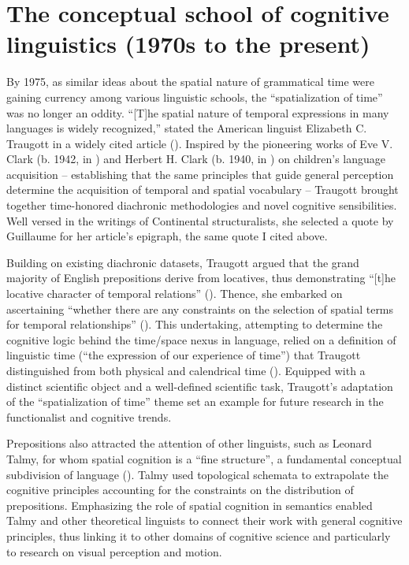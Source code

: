\documentclass[english,output=paper,colorlinks,citecolor=brown]{../langscibook}
\begin{document}
\section{The conceptual school of cognitive linguistics (1970s to the present)}

By 1975, as similar ideas about the spatial nature of grammatical time were gaining currency among various linguistic schools, the “spatialization of time” was no longer an oddity. “[T]he spatial nature of temporal expressions in many languages is widely recognized,” stated the American linguist Elizabeth C. Traugott in a widely cited article (\citeyear[207]{Traugott1975}). Inspired by the pioneering works of Eve V. Clark (b. 1942, in \citeyear{Clark1971}) and Herbert H. Clark (b. 1940, in \citeyear{Clark1973}) on children’s language acquisition -- establishing that the same principles that guide general perception determine the acquisition of temporal and spatial vocabulary -- Traugott brought together time-honored diachronic methodologies and novel cognitive sensibilities. Well versed in the writings of Continental structuralists, she selected a quote by Guillaume for her article’s epigraph, the same quote I cited above.

Building on existing diachronic datasets, Traugott argued that the grand majority of English prepositions derive from locatives, thus demonstrating “[t]he locative character of temporal relations” (\citeyear[209]{Traugott1975}). Thence, she embarked on ascertaining “whether there are any constraints on the selection of spatial terms for temporal relationships” (\citeyear[207]{Traugott1975}). This undertaking, attempting to determine the cognitive logic behind the time/space nexus in language, relied on a definition of linguistic time (“the expression of our experience of time”) that Traugott distinguished from both physical and calendrical time (\citeyear{Traugott1975}). Equipped with a distinct scientific object and a well-defined scientific task, Traugott’s adaptation of the “spatialization of time” theme set an example for future research in the functionalist and cognitive trends. 

Prepositions also attracted the attention of other linguists, such as Leonard Talmy, for whom spatial cognition is a “fine structure”, a fundamental conceptual subdivision of language (\citeyear[225]{Talmy1983}). Talmy used topological schemata to extrapolate the cognitive principles accounting for the constraints on the distribution of prepositions. Emphasizing the role of spatial cognition in semantics enabled Talmy and other theoretical linguists to connect their work with general cognitive principles, thus linking it to other domains of cognitive science and particularly to research on visual perception and motion. 
\end{document}
